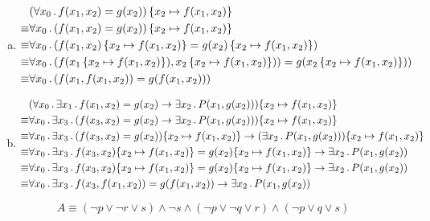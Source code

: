 \begin{enumerate}[a)]
	\item \begin{align*}
		& (\forall x_0 \, . \,f(x_1,x_2) = g(x_2)) \, \{x_2 \mapsto f(x_1,x_2)\} \\
 \equiv & \forall x_0 \, . \,(f(x_1,x_2) = g(x_2)) \, \{x_2 \mapsto f(x_1,x_2)\} \\
 \equiv & \forall x_0 \, . \,(f(x_1,x_2)\, \{x_2 \mapsto f(x_1,x_2)\} = g(x_2)\, \{x_2 \mapsto f(x_1,x_2)\})  \\
 \equiv & \forall x_0 \, . \,(f(x_1\, \{x_2 \mapsto f(x_1,x_2)\}),x_2\, \{x_2 \mapsto f(x_1,x_2)\})) = g(x_2\, \{x_2 \mapsto f(x_1,x_2)\}))  \\
 \equiv & \forall x_0 \, . \,(f(x_1,f(x_1,x_2)) = g(f(x_1,x_2)))  \\
	\end{align*}
	\item \begin{align*}
		& (\forall x_0 \, . \, \exists x_1 \, . \,f(x_1, x_2) = g(x_2) \to \exists x_2 \, . \, P(x_1, g(x_2))) \{x_2 \mapsto f(x_1, x_2)\} \\
		\equiv & \forall x_0 \, . \, \exists x_3 \, . \,(f(x_3, x_2) = g(x_2) \to \exists x_2 \, . \, P(x_1, g(x_2))) \{x_2 \mapsto f(x_1, x_2)\} \\
		\equiv & \forall x_0 \, . \, \exists x_3 \, . \,(f(x_3, x_2) = g(x_2))\{x_2 \mapsto f(x_1, x_2)\} \to (\exists x_2 \, . \, P(x_1, g(x_2))) \{x_2 \mapsto f(x_1, x_2)\} \\
		\equiv & \forall x_0 \, . \, \exists x_3 \, . \,f(x_3, x_2)\{x_2 \mapsto f(x_1, x_2)\} = g(x_2)\{x_2 \mapsto f(x_1, x_2)\} \to \exists x_2 \, . \, P(x_1, g(x_2)) \\
		\equiv & \forall x_0 \, . \, \exists x_3 \, . \,f(x_3, x_2)\{x_2 \mapsto f(x_1, x_2)\} = g(x_2)\{x_2 \mapsto f(x_1, x_2)\} \to \exists x_2 \, . \, P(x_1, g(x_2)) \\
		\equiv & \forall x_0 \, . \, \exists x_3 \, . \,f(x_3, f(x_1, x_2)) = g(f(x_1, x_2)) \to \exists x_2 \, . \, P(x_1, g(x_2)) 
	\end{align*}
\end{enumerate}


$$ A \equiv (\lnot p\lor \lnot r\lor s)\land \lnot s\land (\lnot p\lor \lnot q\lor r)\land (\lnot p\lor q\lor s) $$

